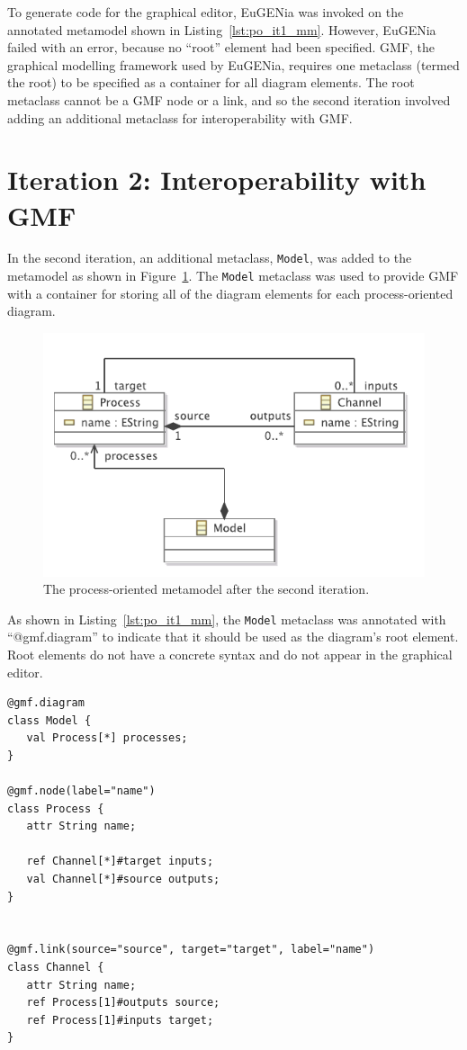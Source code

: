 To generate code for the graphical editor, EuGENia was invoked on the annotated metamodel shown in Listing~\ref{lst:po_it1_mm}. However, EuGENia failed with an error, because no ``root'' element had been specified. GMF, the graphical modelling framework used by EuGENia, requires one metaclass (termed the root) to be specified as a container for all diagram elements. The root metaclass cannot be a GMF node or a link, and so the second iteration involved adding an additional metaclass for interoperability with GMF.


\section{Iteration 2: Interoperability with GMF}
In the second iteration, an additional metaclass, \texttt{Model}, was added to the metamodel as shown in Figure~\ref{fig:po_it2_mm}. The \texttt{Model} metaclass was used to provide GMF with a container for storing all of the diagram elements for each process-oriented diagram.

\begin{figure}[htbp]
	\centering
		\includegraphics[scale=0.75]{A.2.ProcessOriented/images/2_mm.pdf}
	\caption{The process-oriented metamodel after the second iteration.}
	\label{fig:po_it2_mm}
\end{figure}

As shown in Listing~\ref{lst:po_it1_mm}, the \texttt{Model} metaclass was annotated with ``@gmf.diagram'' to indicate that it should be used as the diagram's root element. Root elements do not have a concrete syntax and do not appear in the graphical editor.

\begin{lstlisting}[caption=The annotated process-oriented metamodel after the second iteration, label=lst:po_it2_mm, language=Emfatic]
@gmf.diagram
class Model {
   val Process[*] processes;
}

@gmf.node(label="name")
class Process {
   attr String name;
      
   ref Channel[*]#target inputs;
   val Channel[*]#source outputs; 
}


@gmf.link(source="source", target="target", label="name")
class Channel { 
   attr String name;
   ref Process[1]#outputs source;
   ref Process[1]#inputs target;
}
\end{lstlisting}

